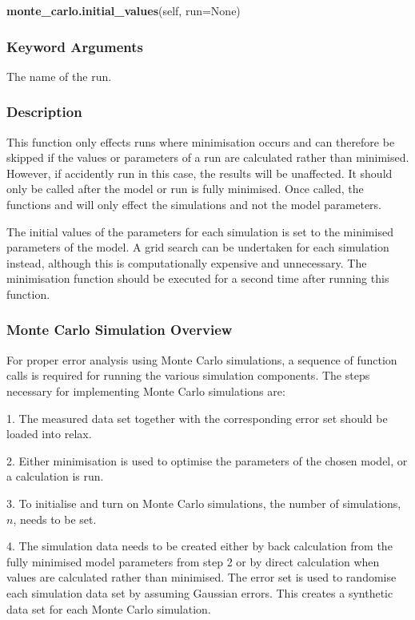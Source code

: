 \textsf{\textbf{monte\_carlo.initial\_values}(self, run=None)}


\subsubsection{Keyword Arguments}


  The name of the run.

\subsubsection{Description}

This function only effects runs where minimisation occurs and can therefore be skipped if
the values or parameters of a run are calculated rather than minimised.  However, if
accidently run in this case, the results will be unaffected.  It should only be called after
the model or run is fully minimised.  Once called, the functions 
 and
 will only effect the simulations and not the model parameters.

The initial values of the parameters for each simulation is set to the minimised parameters
of the model.  A grid search can be undertaken for each simulation instead, although this
is computationally expensive and unnecessary.  The minimisation function should be executed
for a second time after running this function.



\subsubsection{Monte Carlo Simulation Overview}

For proper error analysis using Monte Carlo simulations, a sequence of function calls is
required for running the various simulation components.  The steps necessary for
implementing Monte Carlo simulations are:

1.  The measured data set together with the corresponding error set should be loaded into
relax.

2.  Either minimisation is used to optimise the parameters of the chosen model, or a
calculation is run.

3.  To initialise and turn on Monte Carlo simulations, the number of simulations, $n$, needs
to be set.

4.  The simulation data needs to be created either by back calculation from the fully
minimised model parameters from step 2 or by direct calculation when values are calculated
rather than minimised.  The error set is used to randomise each simulation data set by
assuming Gaussian errors.  This creates a synthetic data set for each Monte Carlo
simulation.

